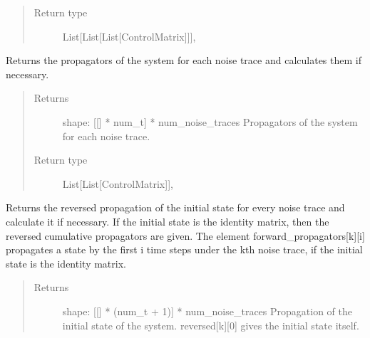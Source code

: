 \documentclass[letterpaper,10pt,english]{sphinxmanual}
\begin{document}
\begin{fulllineitems}
\begin{fulllineitems}
\begin{quote}
\begin{description}
\item[{Return type}] \leavevmode
List{[}List{[}List{[}ControlMatrix{]}{]}{]},

\end{description}\end{quote}

\end{fulllineitems}


\begin{fulllineitems}
\label{\detokenize{qsim:qsim.solver_algorithms.SchroedingerSMonteCarlo.propagators_noise}}
Returns the propagators of the system for each noise trace and
calculates them if necessary.
\begin{quote}\begin{description}
\item[{Returns}] \leavevmode
{} \textendash{}                shape: {[}{[}{]} * num\_t{]} * num\_noise\_traces
Propagators of the system for each noise trace.

\item[{Return type}] \leavevmode
List{[}List{[}ControlMatrix{]}{]},

\end{description}\end{quote}

\end{fulllineitems}


\begin{fulllineitems}
\label{\detokenize{qsim:qsim.solver_algorithms.SchroedingerSMonteCarlo.reversed_propagators_noise}}
Returns the reversed propagation of the initial state for every noise
trace and calculate it if necessary. If the initial state is the
identity matrix, then the reversed cumulative propagators are given.
The element forward\_propagators{[}k{]}{[}i{]} propagates a state by the first i
time steps under the kth noise trace, if the initial state is the
identity matrix.
\begin{quote}\begin{description}
\item[{Returns}] \leavevmode
{} \textendash{}     shape: {[}{[}{]} * (num\_t + 1){]} * num\_noise\_traces
Propagation of the initial state of the system. reversed{[}k{]}{[}0{]}
gives the initial state itself.


\end{description}
\end{quote}
\end{fulllineitems}
\end{fulllineitems}
\end{document}
